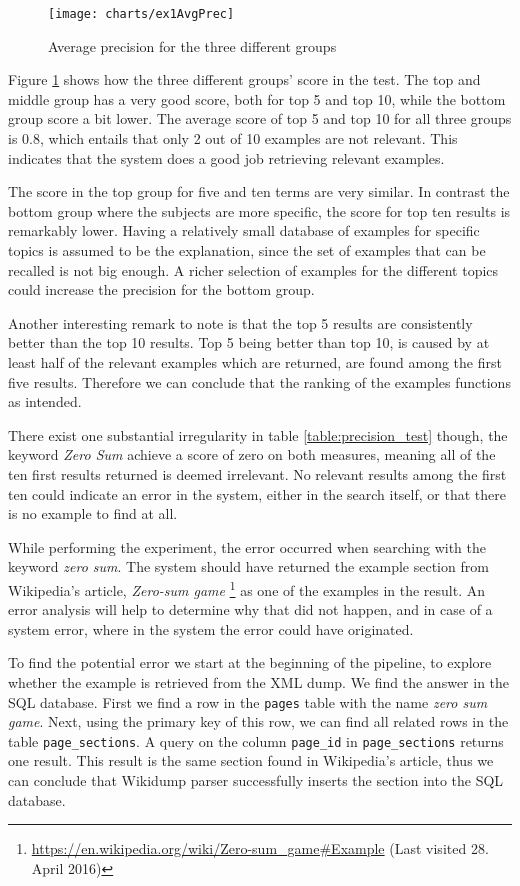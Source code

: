 \begin{figure}[H] 
\caption{Average precision for the three different groups}
\texttt{[image: charts/ex1AvgPrec]}
\label{fig:ex1AvgPrec}
\end{figure}

Figure \ref{fig:ex1AvgPrec} shows how the three different groups' score in the test. The top and middle group has a very good score, both for top 5 and top 10, while the bottom group score a bit lower. The average score of top 5 and top 10 for all three groups is \(0.8\), which entails that only 2 out of 10 examples are not relevant. This indicates that the system does a good job retrieving relevant examples.

The score in the top group for five and ten terms are very similar. In contrast the bottom group where the subjects are more specific, the score for top ten results is remarkably lower. Having a relatively small database of examples for specific topics is assumed to be the explanation, since the set of examples that can be recalled is not big enough. A richer selection of examples for the different topics could increase the precision for the bottom group. 

Another interesting remark to note is that the top 5 results are consistently better than the top 10 results. Top 5 being better than top 10, is caused by at least half of the relevant examples which are returned, are found among the first five results. Therefore we can conclude that the ranking of the examples functions as intended. 

There exist one substantial irregularity in table \ref{table:precision_test} though, the keyword \textit{Zero Sum} achieve a score of zero on both measures, meaning all of the ten first results returned is deemed irrelevant. No relevant results among the first ten could indicate an error in the system, either in the search itself, or that there is no example to find at all. 

While performing the experiment, the error occurred when searching with the keyword \textit{zero sum}. The system should have returned the example section from Wikipedia's article, \textit{Zero-sum game} \footnote{\url{https://en.wikipedia.org/wiki/Zero-sum\_game\#Example} (Last visited 28. April 2016)} as one of the examples in the result. An error analysis will help to determine why that did not happen, and in case of a system error, where in the system the error could have originated. 

To find the potential error we start at the beginning of the pipeline, to explore whether the example is retrieved from the XML dump. We find the answer in the SQL database. First we find a row in the \texttt{pages} table with the name \textit{zero sum game}. Next, using the primary key of this row, we can find all related rows in the table \texttt{page\_sections}. A query on the column \texttt{page\_id} in \texttt{page\_sections} returns one result. This result is the same section found in Wikipedia's article, thus we can conclude that Wikidump parser successfully inserts the section into the SQL database.

